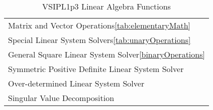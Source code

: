 \begin{table}[H]
\caption{VSIPL1p3 Linear Algebra Functions}
\label{tab:linearAlgebraFunctions}
\begin{center}
\begin{tabular}{l}
Matrix and Vector Operations\ref{tab:elementaryMath}\\
Special Linear System Solvers\ref{tab:unaryOperations}\\
General Square Linear System Solver\ref{binaryOperations}\\
Symmetric Positive Definite Linear System Solver\\
Over-determined Linear System Solver\\
Singular Value Decomposition\\
\end{tabular}
\end{center}
\label{default}
\end{table}%